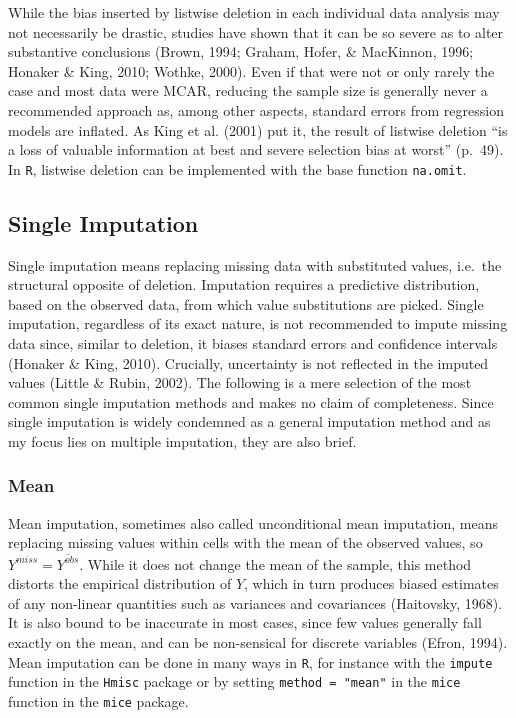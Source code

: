 \documentclass[12pt,econ]{sources/authesis}
\begin{document}
While the bias inserted by listwise deletion in each individual data analysis may not necessarily be drastic, studies have shown that it can be so severe as to alter substantive conclusions (Brown, 1994; Graham, Hofer, \& MacKinnon, 1996; Honaker \& King, 2010; Wothke, 2000). Even if that were not or only rarely the case and most data were MCAR, reducing the sample size is generally never a recommended approach as, among other aspects, standard errors from regression models are inflated. As King et al. (2001) put it, the result of listwise deletion ``is a loss of valuable information at best and severe selection bias at worst'' (p.~49). In \texttt{R}, listwise deletion can be implemented with the base function \texttt{na.omit}.

\hypertarget{ordmiss-theory-singimpute}{%
\subsection{Single Imputation}\label{ordmiss-theory-singimpute}}

Single imputation means replacing missing data with substituted values, i.e.~the structural opposite of deletion. Imputation requires a predictive distribution, based on the observed data, from which value substitutions are picked. Single imputation, regardless of its exact nature, is not recommended to impute missing data since, similar to deletion, it biases standard errors and confidence intervals (Honaker \& King, 2010). Crucially, uncertainty is not reflected in the imputed values (Little \& Rubin, 2002). The following is a mere selection of the most common single imputation methods and makes no claim of completeness. Since single imputation is widely condemned as a general imputation method and as my focus lies on multiple imputation, they are also brief.

\hypertarget{ordmiss-theory-impute-mean}{%
\subsubsection{Mean}\label{ordmiss-theory-impute-mean}}

Mean imputation, sometimes also called unconditional mean imputation, means replacing missing values within cells with the mean of the observed values, so \(Y^{miss} = \overline{Y^{obs}}\). While it does not change the mean of the sample, this method distorts the empirical distribution of \(Y\), which in turn produces biased estimates of any non-linear quantities such as variances and covariances (Haitovsky, 1968). It is also bound to be inaccurate in most cases, since few values generally fall exactly on the mean, and can be non-sensical for discrete variables (Efron, 1994). Mean imputation can be done in many ways in \texttt{R}, for instance with the \texttt{impute} function in the \texttt{Hmisc} package or by setting \texttt{method\ =\ "mean"} in the \texttt{mice} function in the \texttt{mice} package.
\end{document}
